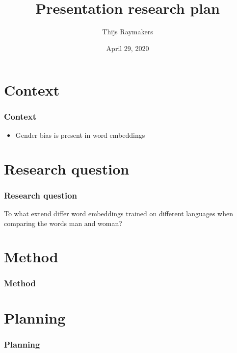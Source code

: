 \documentclass{beamer}
\author{Thijs Raymakers}
\title{Presentation research plan}
\date{April 29, 2020}
\begin{document}
\section{Context}
\begin{frame}
\frametitle{Context}
\begin{itemize}
\item Gender bias is present in word embeddings
\end{itemize}
\end{frame}

\section{Research question}
\begin{frame}
\frametitle{Research question}

To what extend differ word embeddings trained on different languages when comparing
the words man and woman?


\end{frame}

\section{Method}
\begin{frame}
\frametitle{Method}
\end{frame}

\section{Planning}
\begin{frame}
\frametitle{Planning}
\end{frame}
\end{document}
